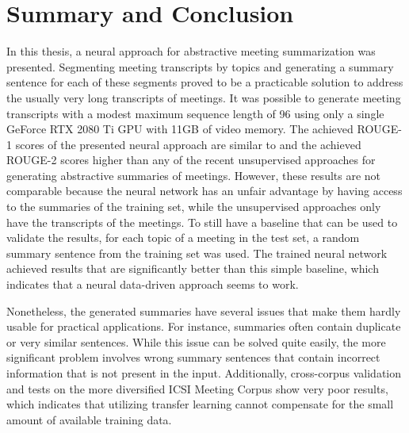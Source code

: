 \chapter{Summary and Conclusion}\label{ch:summary-and-conclusion}

In this thesis, a neural approach for abstractive meeting summarization was presented.
Segmenting meeting transcripts by topics and generating a summary sentence for each of these segments proved to be a practicable solution to address the usually very long transcripts of meetings.
It was possible to generate meeting transcripts with a modest maximum sequence length of 96 using only a single GeForce RTX 2080 Ti GPU with 11GB of video memory.
The achieved ROUGE-1 scores of the presented neural approach are similar to and the achieved ROUGE-2 scores higher than any of the recent unsupervised approaches for generating abstractive summaries of meetings.
However, these results are not comparable because the neural network has an unfair advantage by having access to the summaries of the training set, while the unsupervised approaches only have the transcripts of the meetings.
To still have a baseline that can be used to validate the results, for each topic of a meeting in the test set, a random summary sentence from the training set was used.
The trained neural network achieved results that are significantly better than this simple baseline, which indicates that a neural data-driven approach seems to work.

Nonetheless, the generated summaries have several issues that make them hardly usable for practical applications.
For instance, summaries often contain duplicate or very similar sentences.
While this issue can be solved quite easily, the more significant problem involves wrong summary sentences that contain incorrect information that is not present in the input.
Additionally, cross-corpus validation and tests on the more diversified ICSI Meeting Corpus show very poor results, which indicates that utilizing transfer learning cannot compensate for the small amount of available training data.

